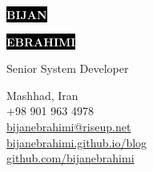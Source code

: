 \documentclass[12pt]{developercv}
\begin{document}
\begin{minipage}[t]{0.65\textwidth} %
	\vspace{-\baselineskip} %
	
	\colorbox{black}{{\HUGE\textcolor{white}{\textbf{\MakeUppercase{Bijan}}}}} %
	
	\colorbox{black}{{\HUGE\textcolor{white}{\textbf{\MakeUppercase{Ebrah‫imi}}}}} %
	
	\vspace{6pt}
	
	{\huge Senior System Developer} %
\end{minipage}
\begin{minipage}[t]{0.35\textwidth} %
	\vspace{-\baselineskip} %
	
	{Mashhad, Iran}\\
	{+98 901 963 4978}\\
	{\href{mailto:bijanebrahimi@riseup.net}{bijanebrahimi@riseup.net}}\\	
	{\href{https://bijanebrahimi.github.io/blog}{bijanebrahimi.github.io/blog}}\\
	{\href{https://github.com/bijanebrahimi}{github.com/bijanebrahimi}}\\
\end{minipage}

\vspace{0.5cm}


\end{document}
